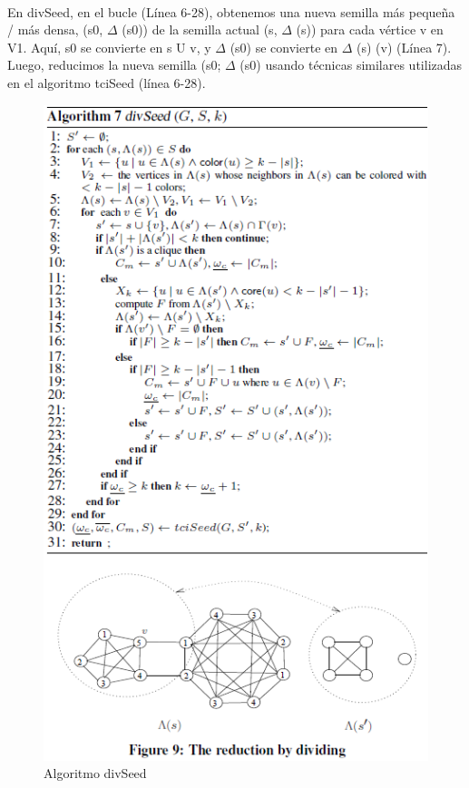 \\
En divSeed, en el bucle (Línea 6-28), obtenemos una nueva semilla más pequeña / más densa, (s0, \begin{math}\Delta\end{math} (s0)) de la semilla actual (s, \begin{math}\Delta\end{math} (s)) para cada vértice v en V1. Aquí, s0 se convierte en s U {v}, y \begin{math}\Delta\end{math} (s0) se convierte en \begin{math}\Delta\end{math} (s) \T(v) (Línea 7). Luego, reducimos la nueva semilla (s0; \begin{math}\Delta\end{math} (s0) usando técnicas similares utilizadas en el algoritmo tciSeed (línea 6-28).
\\
\begin{figure}[h!]
\centering
\includegraphics[scale=.9]{img/imagen17.png}
\caption{Algoritmo divSeed}
\label{Comandos}
\end{figure}
\\
